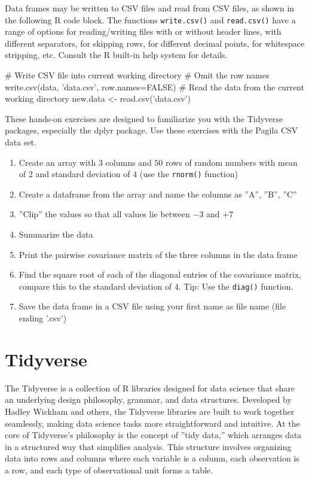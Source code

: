 Data frames may be written to CSV files and read from CSV files, as shown in the following R code block. The functions \texttt{write.csv()} and \texttt{read.csv()} have a range of options for reading/writing files with or without header lines, with different separators, for skipping rows, for different decimal points, for whitespace stripping, etc. Consult the R built-in help system for details.

\begin{Rcode}
# Write CSV file into current working directory
# Omit the row names
write.csv(data, 'data.csv', row.names=FALSE)
# Read the data from the current working directory
new.data <- read.csv('data.csv')
\end{Rcode}

\begin{exercisebox}
These hands-on exercises are designed to familiarize you with the Tidyverse packages, especially the dplyr package. Use these exercises with the Pagila CSV data set.

\begin{enumerate}[nosep]
    \item Create an array with $3$ columns and $50$ rows of random numbers with mean of $2$ and standard deviation of $4$ (use the \texttt{rnorm()} function)
   \item Create a dataframe from the array and name the columns as ''A'', ''B'', ''C''
   \item ''Clip'' the values so that all values lie between $-3$ and $+7$
   \item Summarize the data
   \item Print the pairwise covariance matrix of the three columns in the data frame
   \item Find the square root of each of the diagonal entries of the covariance matrix, compare this to the standard deviation of 4. Tip: Use the \texttt{diag()} function.
   \item Save the data frame in a CSV file using your first name as file name (file ending '.csv')
\end{enumerate}
\end{exercisebox}

\section{Tidyverse}

The Tidyverse is a collection of R libraries designed for data science that share an underlying design philosophy, grammar, and data structures. Developed by Hadley Wickham and others, the Tidyverse libraries are built to work together seamlessly, making data science tasks more straightforward and intuitive. At the core of Tidyverse's philosophy is the concept of ''tidy data,'' which arranges data in a structured way that simplifies analysis. This structure involves organizing data into rows and columns where each variable is a column, each observation is a row, and each type of observational unit forms a table.

